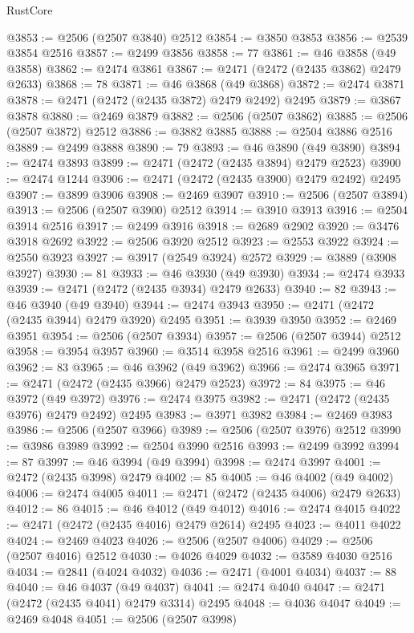 \begin{lexlean}{RustCore}
\begin{coremodule}
@3853 := @2506 (@2507 @3840) @2512
@3854 := @3850 @3853
@3856 := @2539 @3854 @2516
@3857 := @2499 @3856
@3858 := 77
@3861 := @46 @3858 (@49 @3858)
@3862 := @2474 @3861
@3867 := @2471 (@2472 (@2435 @3862) @2479 @2633)
@3868 := 78
@3871 := @46 @3868 (@49 @3868)
@3872 := @2474 @3871
@3878 := @2471 (@2472 (@2435 @3872) @2479 @2492) @2495
@3879 := @3867 @3878
@3880 := @2469 @3879
@3882 := @2506 (@2507 @3862)
@3885 := @2506 (@2507 @3872) @2512
@3886 := @3882 @3885
@3888 := @2504 @3886 @2516
@3889 := @2499 @3888
@3890 := 79
@3893 := @46 @3890 (@49 @3890)
@3894 := @2474 @3893
@3899 := @2471 (@2472 (@2435 @3894) @2479 @2523)
@3900 := @2474 @1244
@3906 := @2471 (@2472 (@2435 @3900) @2479 @2492) @2495
@3907 := @3899 @3906
@3908 := @2469 @3907
@3910 := @2506 (@2507 @3894)
@3913 := @2506 (@2507 @3900) @2512
@3914 := @3910 @3913
@3916 := @2504 @3914 @2516
@3917 := @2499 @3916
@3918 := @2689 @2902
@3920 := @3476 @3918 @2692
@3922 := @2506 @3920 @2512
@3923 := @2553 @3922
@3924 := @2550 @3923
@3927 := @3917 (@2549 @3924) @2572
@3929 := @3889 (@3908 @3927)
@3930 := 81
@3933 := @46 @3930 (@49 @3930)
@3934 := @2474 @3933
@3939 := @2471 (@2472 (@2435 @3934) @2479 @2633)
@3940 := 82
@3943 := @46 @3940 (@49 @3940)
@3944 := @2474 @3943
@3950 := @2471 (@2472 (@2435 @3944) @2479 @3920) @2495
@3951 := @3939 @3950
@3952 := @2469 @3951
@3954 := @2506 (@2507 @3934)
@3957 := @2506 (@2507 @3944) @2512
@3958 := @3954 @3957
@3960 := @3514 @3958 @2516
@3961 := @2499 @3960
@3962 := 83
@3965 := @46 @3962 (@49 @3962)
@3966 := @2474 @3965
@3971 := @2471 (@2472 (@2435 @3966) @2479 @2523)
@3972 := 84
@3975 := @46 @3972 (@49 @3972)
@3976 := @2474 @3975
@3982 := @2471 (@2472 (@2435 @3976) @2479 @2492) @2495
@3983 := @3971 @3982
@3984 := @2469 @3983
@3986 := @2506 (@2507 @3966)
@3989 := @2506 (@2507 @3976) @2512
@3990 := @3986 @3989
@3992 := @2504 @3990 @2516
@3993 := @2499 @3992
@3994 := 87
@3997 := @46 @3994 (@49 @3994)
@3998 := @2474 @3997
@4001 := @2472 (@2435 @3998) @2479
@4002 := 85
@4005 := @46 @4002 (@49 @4002)
@4006 := @2474 @4005
@4011 := @2471 (@2472 (@2435 @4006) @2479 @2633)
@4012 := 86
@4015 := @46 @4012 (@49 @4012)
@4016 := @2474 @4015
@4022 := @2471 (@2472 (@2435 @4016) @2479 @2614) @2495
@4023 := @4011 @4022
@4024 := @2469 @4023
@4026 := @2506 (@2507 @4006)
@4029 := @2506 (@2507 @4016) @2512
@4030 := @4026 @4029
@4032 := @3589 @4030 @2516
@4034 := @2841 (@4024 @4032)
@4036 := @2471 (@4001 @4034)
@4037 := 88
@4040 := @46 @4037 (@49 @4037)
@4041 := @2474 @4040
@4047 := @2471 (@2472 (@2435 @4041) @2479 @3314) @2495
@4048 := @4036 @4047
@4049 := @2469 @4048
@4051 := @2506 (@2507 @3998)

\end{coremodule}
\end{lexlean}
